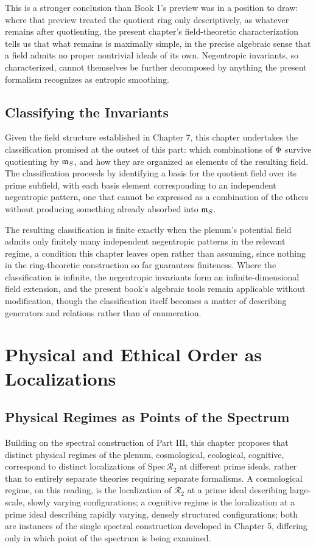 This is a stronger conclusion than Book 1's preview was in a position to draw: where that preview treated the quotient ring only descriptively, as whatever remains after quotienting, the present chapter's field-theoretic characterization tells us that what remains is maximally simple, in the precise algebraic sense that a field admits no proper nontrivial ideals of its own. Negentropic invariants, so characterized, cannot themselves be further decomposed by anything the present formalism recognizes as entropic smoothing.

\chapter{Classifying the Invariants}

Given the field structure established in Chapter 7, this chapter undertakes the classification promised at the outset of this part: which combinations of $\Phi$ survive quotienting by $\mathfrak{m}_{S}$, and how they are organized as elements of the resulting field. The classification proceeds by identifying a basis for the quotient field over its prime subfield, with each basis element corresponding to an independent negentropic pattern, one that cannot be expressed as a combination of the others without producing something already absorbed into $\mathfrak{m}_{S}$.

The resulting classification is finite exactly when the plenum's potential field admits only finitely many independent negentropic patterns in the relevant regime, a condition this chapter leaves open rather than assuming, since nothing in the ring-theoretic construction so far guarantees finiteness. Where the classification is infinite, the negentropic invariants form an infinite-dimensional field extension, and the present book's algebraic tools remain applicable without modification, though the classification itself becomes a matter of describing generators and relations rather than of enumeration.

\part{Physical and Ethical Order as Localizations}

\chapter{Physical Regimes as Points of the Spectrum}

Building on the spectral construction of Part III, this chapter proposes that distinct physical regimes of the plenum, cosmological, ecological, cognitive, correspond to distinct localizations of $\mathrm{Spec}\,\mathcal{R}_2$ at different prime ideals, rather than to entirely separate theories requiring separate formalisms. A cosmological regime, on this reading, is the localization of $\mathcal{R}_2$ at a prime ideal describing large-scale, slowly varying configurations; a cognitive regime is the localization at a prime ideal describing rapidly varying, densely structured configurations; both are instances of the single spectral construction developed in Chapter 5, differing only in which point of the spectrum is being examined.

